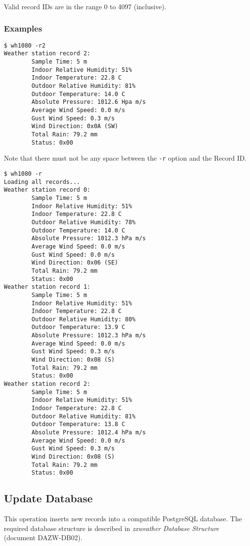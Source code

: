 \documentclass[a4paper,10pt,draft]{book}
\begin{document}
Valid record IDs are in the range 0 to 4097 (inclusive).

\subsubsection{Examples}
\begin{verbatim}
$ wh1080 -r2
Weather station record 2:
        Sample Time: 5 m
        Indoor Relative Humidity: 51%
        Indoor Temperature: 22.8 C
        Outdoor Relative Humidity: 81%
        Outdoor Temperature: 14.0 C
        Absolute Pressure: 1012.6 Hpa m/s
        Average Wind Speed: 0.0 m/s
        Gust Wind Speed: 0.3 m/s
        Wind Direction: 0x0A (SW)
        Total Rain: 79.2 mm
        Status: 0x00
\end{verbatim}
Note that there must not be any space between the \verb|-r| option and the Record ID.

\begin{verbatim}
$ wh1080 -r
Loading all records...
Weather station record 0:
        Sample Time: 5 m
        Indoor Relative Humidity: 51%
        Indoor Temperature: 22.8 C
        Outdoor Relative Humidity: 78%
        Outdoor Temperature: 14.0 C
        Absolute Pressure: 1012.3 hPa m/s
        Average Wind Speed: 0.0 m/s
        Gust Wind Speed: 0.0 m/s
        Wind Direction: 0x06 (SE)
        Total Rain: 79.2 mm
        Status: 0x00
Weather station record 1:
        Sample Time: 5 m
        Indoor Relative Humidity: 51%
        Indoor Temperature: 22.8 C
        Outdoor Relative Humidity: 80%
        Outdoor Temperature: 13.9 C
        Absolute Pressure: 1012.3 hPa m/s
        Average Wind Speed: 0.0 m/s
        Gust Wind Speed: 0.3 m/s
        Wind Direction: 0x08 (S)
        Total Rain: 79.2 mm
        Status: 0x00        
Weather station record 2:
        Sample Time: 5 m
        Indoor Relative Humidity: 51%
        Indoor Temperature: 22.8 C
        Outdoor Relative Humidity: 81%
        Outdoor Temperature: 13.8 C
        Absolute Pressure: 1012.4 hPa m/s
        Average Wind Speed: 0.0 m/s
        Gust Wind Speed: 0.3 m/s
        Wind Direction: 0x08 (S)
        Total Rain: 79.2 mm
        Status: 0x00        
\end{verbatim}

\subsection{Update Database}
This operation inserts new records into a compatible PostgreSQL database. The required database structure is described in \emph{zxweather Database Structure} (document DAZW-DB02).
\end{document}
